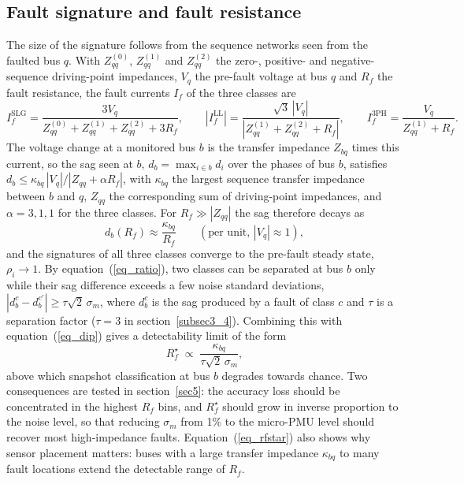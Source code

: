 \documentclass[11pt]{article}
\newenvironment{nw}{}{}
\begin{document}
\begin{nw}
\subsection{Fault signature and fault resistance}\label{subsec3_0b}

The size of the signature follows from the sequence networks seen from the faulted bus $q$. With $Z^{(0)}_{qq}$, $Z^{(1)}_{qq}$ and $Z^{(2)}_{qq}$ the zero-, positive- and negative-sequence driving-point impedances, $V_q$ the pre-fault voltage at bus $q$ and $R_f$ the fault resistance, the fault currents $I_f$ of the three classes are
\begin{equation}\label{eq_if}
I_f^{\mathrm{SLG}}=\frac{3V_q}{Z^{(0)}_{qq}+Z^{(1)}_{qq}+Z^{(2)}_{qq}+3R_f},\qquad
|I_f^{\mathrm{LL}}|=\frac{\sqrt3\,|V_q|}{|Z^{(1)}_{qq}+Z^{(2)}_{qq}+R_f|},\qquad
I_f^{\mathrm{3PH}}=\frac{V_q}{Z^{(1)}_{qq}+R_f}.
\end{equation}
The voltage change at a monitored bus $b$ is the transfer impedance $Z_{bq}$ times this current, so the sag seen at $b$, $d_b=\max_{i\in b}d_i$ over the phases of bus $b$, satisfies $d_b\le\kappa_{bq}\,|V_q|/|Z_{qq}+\alpha R_f|$, with $\kappa_{bq}$ the largest sequence transfer impedance between $b$ and $q$, $Z_{qq}$ the corresponding sum of driving-point impedances, and $\alpha=3,1,1$ for the three classes. For $R_f\gg|Z_{qq}|$ the sag therefore decays as
\begin{equation}\label{eq_dip}
d_b(R_f)\approx\frac{\kappa_{bq}}{R_f}\qquad(\text{per unit, }|V_q|\approx1),
\end{equation}
and the signatures of all three classes converge to the pre-fault steady state, $\rho_i\to1$. By equation~(\ref{eq_ratio}), two classes can be separated at bus $b$ only while their sag difference exceeds a few noise standard deviations, $|d_b^{c}-d_b^{c'}|\ge\tau\sqrt2\,\sigma_m$, where $d_b^{c}$ is the sag produced by a fault of class $c$ and $\tau$ is a separation factor ($\tau=3$ in section~\ref{subsec3_4}). Combining this with equation~(\ref{eq_dip}) gives a detectability limit of the form
\begin{equation}\label{eq_rfstar}
R_f^{\star}\;\propto\;\frac{\kappa_{bq}}{\tau\sqrt2\,\sigma_m},
\end{equation}
above which snapshot classification at bus $b$ degrades towards chance. Two consequences are tested in section~\ref{sec5}: the accuracy loss should be concentrated in the highest $R_f$ bins, and $R_f^{\star}$ should grow in inverse proportion to the noise level, so that reducing $\sigma_m$ from 1\% to the micro-PMU level should recover most high-impedance faults. Equation~(\ref{eq_rfstar}) also shows why sensor placement matters: buses with a large transfer impedance $\kappa_{bq}$ to many fault locations extend the detectable range of $R_f$.
\end{nw}
\end{document}
